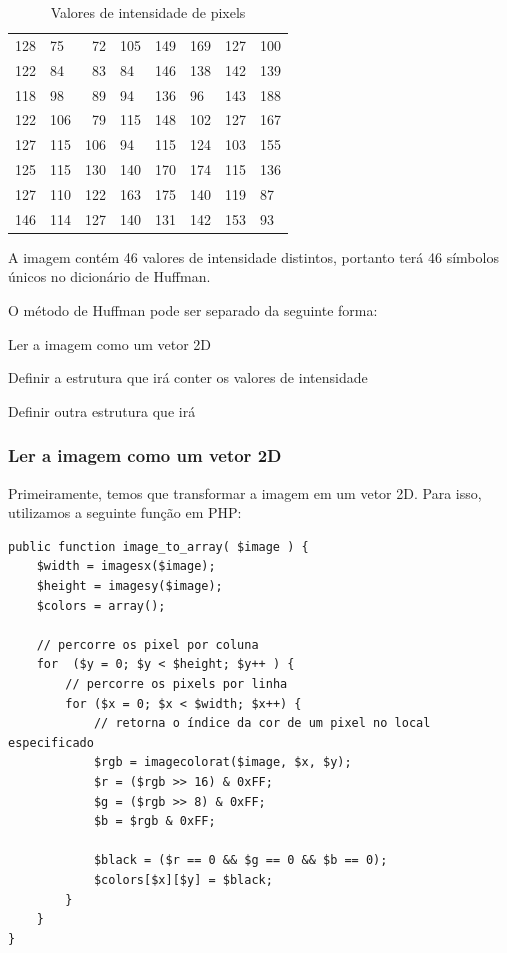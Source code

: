 \begin{table}[]
    \begin{center}
        \caption{\small Valores de intensidade de pixels}
        \label{t.imagecompressionbasics}
        \begin{tabular}{llrlllll}
            128 & 75  & 72  & 105 & 149 & 169 & 127 & 100 \\
            122 & 84  & 83  & 84  & 146 & 138 & 142 & 139 \\
            118 & 98  & 89  & 94  & 136 & 96  & 143 & 188 \\
            122 & 106 & 79  & 115 & 148 & 102 & 127 & 167 \\
            127 & 115 & 106 & 94  & 115 & 124 & 103 & 155 \\
            125 & 115 & 130 & 140 & 170 & 174 & 115 & 136 \\
            127 & 110 & 122 & 163 & 175 & 140 & 119 & 87  \\
            146 & 114 & 127 & 140 & 131 & 142 & 153 & 93
        \end{tabular}
    \end{center}
\end{table}

A imagem contém 46 valores de intensidade distintos, portanto terá 46 símbolos únicos no dicionário de Huffman.

O método de Huffman pode ser separado da seguinte forma:

\begin{alineas}
    \item Ler a imagem como um vetor 2D
    \item Definir a estrutura que irá conter os valores de intensidade
    \item Definir outra estrutura que irá
\end{alineas}

\subsubsection{Ler a imagem como um vetor 2D}
\label{sss.imagetoarray}

Primeiramente, temos que transformar a imagem em um vetor 2D. Para isso, utilizamos a seguinte função em PHP:

\begin{verbatim}
public function image_to_array( $image ) {
    $width = imagesx($image);
    $height = imagesy($image);
    $colors = array();

    // percorre os pixel por coluna
    for  ($y = 0; $y < $height; $y++ ) {
        // percorre os pixels por linha
        for ($x = 0; $x < $width; $x++) {
            // retorna o índice da cor de um pixel no local especificado
            $rgb = imagecolorat($image, $x, $y);
            $r = ($rgb >> 16) & 0xFF;
            $g = ($rgb >> 8) & 0xFF;
            $b = $rgb & 0xFF;

            $black = ($r == 0 && $g == 0 && $b == 0);
            $colors[$x][$y] = $black;
        }
    }
}
\end{verbatim}
